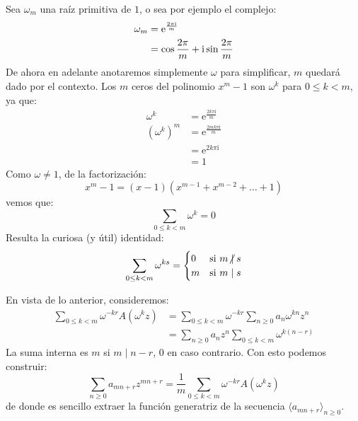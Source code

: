  Sea \(\omega_m\) una raíz primitiva de \(1\),%
  o sea por ejemplo el complejo:
  \begin{align}
    \omega_m
      &= \mathrm{e}^{\frac{2  \pi \mathrm{i}}{m}}
	      \notag \\
      &= \cos \frac{2  \pi}{m} + \mathrm{i} \sin \frac{2  \pi}{m}
	      \label{eq:omega_m}
  \end{align}
  De ahora en adelante anotaremos simplemente \(\omega\) para simplificar,
  \(m\) quedará dado por el contexto.
  Los \(m\) ceros del polinomio \(x^m - 1\)
  son \(\omega^k\) para \(0 \le k < m\),
  ya que:
  \begin{align*}
    \omega^k
      &= \mathrm{e}^{\frac{2  k \pi \mathrm{i}}{m}} \\
    \left( \omega^k \right)^m
      &= \mathrm{e}^{\frac{2  m k \pi \mathrm{i}}{m}} \\
      &= \mathrm{e}^{2	k \pi \mathrm{i}} \\
      &= 1
  \end{align*}
  Como \(\omega \ne 1\),
  de la factorización:
  \begin{equation*}
    x^m - 1
      = (x - 1) (x^{m - 1} + x^{m - 2} + \dotsc + 1)
  \end{equation*}
  vemos que:
  \begin{equation*}
    \sum_{0 \le k < m} \omega^k
      = 0
  \end{equation*}
  Resulta la curiosa
  (y útil) identidad:
  \begin{equation}
    \label{eq:sum-omega-powers}
    \sum_{0 \le k < m} \omega^{k s}
      = \begin{cases}
	  0 & \text{si \(m \centernot\mid s\)} \\
	  m & \text{si \(m \mid s\)}
	\end{cases}
  \end{equation}

  En vista de lo anterior,
  consideremos:
  \begin{align*}
    \sum_{0 \le k < m} \omega^{- k r} A(\omega^k z)
      &= \sum_{0 \le k < m} \omega^{- k r}
	   \sum_{n \ge 0} a_n \omega^{k n} z^n \\
      &= \sum_{n \ge 0} a_n z^n \sum_{0 \le k < m} \omega^{k (n - r)}
  \end{align*}
  La suma interna es \(m\) si \(m \mid n - r\),
  \(0\) en caso contrario.
  Con esto podemos construir:
  \begin{equation}
    \label{eq:decimation}
    \sum_{n \ge 0} a_{m n + r} z^{m n + r}
      = \frac{1}{m} \sum_{0 \le k < m} \omega^{-k r} A(\omega^k z)
  \end{equation}
  de donde es sencillo extraer la función generatriz de la secuencia
  \(\langle a_{m n + r} \rangle_{n \ge 0}\).


